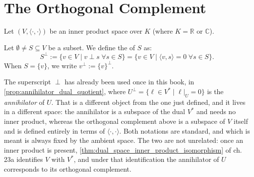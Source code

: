 \renewcommand{\thetheorem}{22.b.\arabic{theorem}}
\setcounter{theorem}{0}

\section{The Orthogonal Complement}

Let $(V, \langle \cdot, \cdot \rangle)$ be an inner product space over $K$ (where $K = \mathbb{R}$ or $\mathbb{C}$).

\begin{definition}
\label{def:orthogonal_complement}
Let $\emptyset \neq S \subseteq V$ be a subset. We define the  of $S$ as:
\[
    S^\perp := \{v \in V \mid v \perp s \;\forall s \in S\} = \{v \in V \mid \langle v, s \rangle = 0 \;\forall s \in S\}.
\]
When $S = \{v\}$, we write $v^\perp := \{v\}^\perp$.
\end{definition}

\begin{importantremark}
\label{rem:perp_two_meanings}
The superscript $\perp$ has already been used once in this book, in
\cref{prop:annihilator_dual_quotient}, where $U^\perp = \{\ell \in V^* \mid \ell|_U = 0\}$
is the \emph{annihilator} of $U$. That is a different object from the one just
defined, and it lives in a different space: the annihilator is a subspace of the
dual $V^*$ and needs no inner product, whereas the orthogonal complement above
is a subspace of $V$ itself and is defined entirely in terms of
$\langle \cdot, \cdot \rangle$. Both notations are standard, and which is meant
is always fixed by the ambient space. The two are not unrelated: once an inner
product is present, \cref{thm:dual_space_inner_product_isomorphism} of ch. 23a
identifies $V$ with $V^*$, and under that identification the annihilator of $U$
corresponds to its orthogonal complement.
\end{importantremark}

